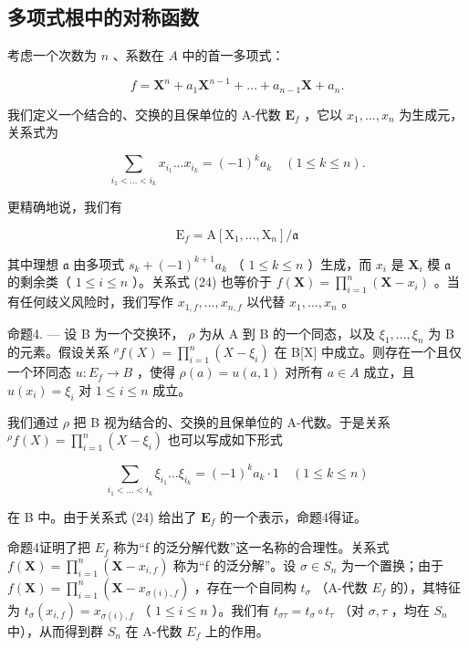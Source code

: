 \subsection{多项式根中的对称函数}

考虑一个次数为 \(n\) 、系数在 \(A\) 中的首一多项式：

\[
f = \mathbf {X} ^ {n} + a _ {1} \mathbf {X} ^ {n - 1} + \dots + a _ {n - 1} \mathbf {X} + a _ {n}.
\]

我们定义一个结合的、交换的且保单位的 A-代数 \(\mathbf{E}_f\) ，它以 \(x_{1},\ldots ,x_{n}\) 为生成元，关系式为

\[
\sum_ {i _ {1} <   \dots <   i _ {k}} x _ {i _ {1}} \dots x _ {i _ {k}} = (- 1) ^ {k} a _ {k} \quad (1 \leqslant k \leqslant n).\tag{24}
\]

更精确地说，我们有

\[
\mathrm{E} _ {f} = \mathrm{A} [ \mathrm{X} _ {1}, \dots , \mathrm{X} _ {n} ] / \mathfrak {a}
\]

其中理想 \(\mathfrak{a}\) 由多项式 \(s_k + (-1)^{k+1} a_k\) （ \(1 \leqslant k \leqslant n\) ）生成，而 \(x_i\) 是 \(\mathbf{X}_i\) 模 \(\mathfrak{a}\) 的剩余类（ \(1 \leqslant i \leqslant n\) ）。关系式 (24) 也等价于 \(f(\mathbf{X}) = \prod_{i=1}^{n} (\mathbf{X} - x_i)\) 。当有任何歧义风险时，我们写作 \(x_{1,f}, \ldots, x_{n,f}\) 以代替 \(x_1, \ldots, x_n\) 。

命题4. --- 设 B 为一个交换环， \(\rho\) 为从 A 到 B 的一个同态，以及 \(\xi_1, \ldots, \xi_n\) 为 B 的元素。假设关系 \( {}^{\rho}f(X) = \prod_{i=1}^{n}(X - \xi_i)\) 在 B{[}X{]} 中成立。则存在一个且仅一个环同态 \(u: E_f \to B\) ，使得 \(\rho(a) = u(a, 1)\) 对所有 \(a \in A\) 成立，且 \(u(x_i) = \xi_i\) 对 \(1 \leqslant i \leqslant n\) 成立。

我们通过 \(\rho\) 把 B 视为结合的、交换的且保单位的 A-代数。于是关系 \({}^{\rho}f(X) = \prod_{i=1}^{n}(X - \xi_i)\) 也可以写成如下形式

\[
\sum_ {i _ {1} <   \dots <   i _ {k}} \xi_ {i _ {1}} \dots \xi_ {i _ {k}} = (- 1) ^ {k} a _ {k} \cdot 1 \quad (1 \leqslant k \leqslant n)
\]

在 B 中。由于关系式 (24) 给出了 \(\mathbf{E}_f\) 的一个表示，命题4得证。

命题4证明了把 \(E_{f}\) 称为“f 的泛分解代数”这一名称的合理性。关系式 \(f(\mathbf{X}) = \prod_{i=1}^{n} (\mathbf{X} - x_{i,f})\) 称为“f 的泛分解”。设 \(\sigma \in S_{n}\) 为一个置换；由于 \(f(\mathbf{X}) = \prod_{i=1}^{n} (\mathbf{X} - x_{\sigma(i),f})\) ，存在一个自同构 \(t_{\sigma}\) （A-代数 \(E_{f}\) 的），其特征为 \(t_{\sigma}(x_{i,f}) = x_{\sigma(i),f}\) （ \(1 \leqslant i \leqslant n\) ）。我们有 \(t_{\sigma\tau} = t_{\sigma} \circ t_{\tau}\) （对 \(\sigma, \tau\) ，均在 \(S_{n}\) 中），从而得到群 \(S_{n}\) 在 A-代数 \(E_{f}\) 上的作用。


